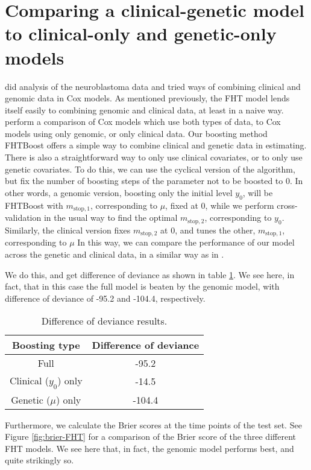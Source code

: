\section{Comparing a clinical-genetic model to clinical-only and genetic-only models}
\citet{bovelstad2009} did analysis of the neuroblastoma data \citep{oberthuer-data} and tried ways of combining clinical and genomic data in Cox models.
As mentioned previously, the FHT model lends itself easily to combining genomic and clinical data, at least in a naive way.
\citet{bovelstad2009} perform a comparison of Cox models which use both types of data, to Cox models using only genomic, or only clinical data.
Our boosting method FHTBoost offers a simple way to combine clinical and genetic data in estimating.
There is also a straightforward way to only use clinical covariates, or to only use genetic covariates.
To do this, we can use the cyclical version of the algorithm, but fix the number of boosting steps of the parameter not to be boosted to 0.
In other words, a genomic version, boosting only the initial level $y_0$, will be FHTBoost with $m_{\text{stop},1}$, corresponding to $\mu$, fixed at 0, while we perform cross-validation in the usual way to find the optimal $m_{\text{stop},2}$, corresponding to $y_0$.
Similarly, the clinical version fixes $m_{\text{stop},2}$ at 0, and tunes the other, $m_{\text{stop},1}$, corresponding to $\mu$
In this way, we can compare the performance of our model across the genetic and clinical data, in a similar way as in \citet{bovelstad2009}.

We do this, and get difference of deviance as shown in table \ref{tab:deviances}.
We see here, in fact, that in this case the full model is beaten by the genomic model, with difference of deviance of -95.2 and -104.4, respectively.

\begin{table}
\caption{Difference of deviance results.}
\label{tab:deviances}
\centering
\begin{tabular}{cc}
\toprule
Boosting type & Difference of deviance \\
\hline
Full & -95.2 \\
Clinical ($y_0$) only  & -14.5 \\
Genetic ($\mu$) only & -104.4 \\
\bottomrule
\end{tabular}
\end{table}

Furthermore, we calculate the Brier scores at the time points of the test set.
See Figure \ref{fig:brier-FHT} for a comparison of the Brier score of the three different FHT models.
We see here that, in fact, the genomic model performs best, and quite strikingly so.

